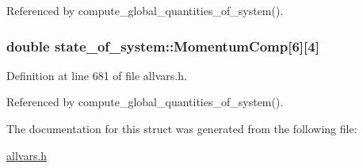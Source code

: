 Referenced by compute\_\-global\_\-quantities\_\-of\_\-system().

\hypertarget{structstate__of__system_a795ecb5f9b1749847bdb2d8d275323c1}{
\subsubsection[{MomentumComp}]{\setlength{\rightskip}{0pt plus 5cm}double {\bf state\_\-of\_\-system::MomentumComp}\mbox{[}6\mbox{]}\mbox{[}4\mbox{]}}}
\label{structstate__of__system_a795ecb5f9b1749847bdb2d8d275323c1}


Definition at line 681 of file allvars.h.



Referenced by compute\_\-global\_\-quantities\_\-of\_\-system().



The documentation for this struct was generated from the following file:\begin{DoxyCompactItemize}
\item 
\hyperlink{allvars_8h}{allvars.h}\end{DoxyCompactItemize}
